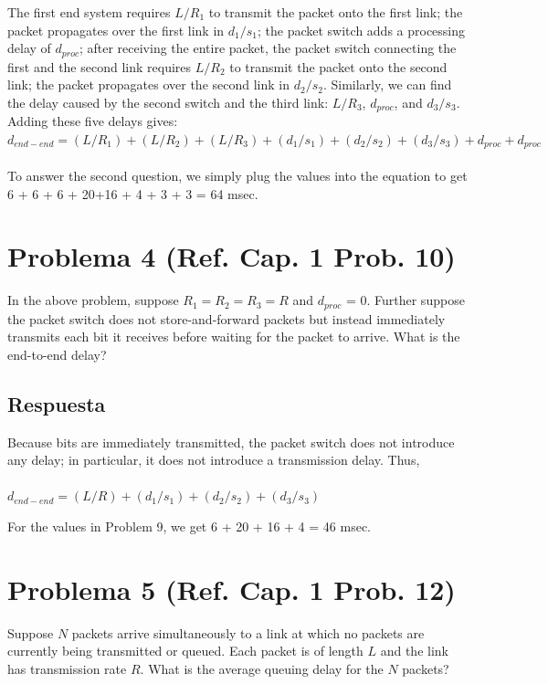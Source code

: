 \documentclass[10pt,spanish]{article}
\numberwithin{figure}{section} %
\begin{document}
The first end system requires $L/R_1$ to transmit the packet onto the first link; the packet propagates over the first link in $d_1 / s_1$; the packet switch adds a processing delay of $d_{proc}$; after receiving the entire packet, the packet switch connecting the first and the second link requires $L / R_2$ to transmit the packet onto the second link; the packet propagates over the second link in $d_2 / s_2$. Similarly, we can find the delay caused by the second switch and the third link: $L / R_3$, $d_{proc}$, and $d_3 / s_3$.\\
Adding these five delays gives: $d_{end-end} = (L / R_1) + (L / R_2) + (L / R_3) + (d_1 / s_1) + (d_2 / s_2) + (d_3 / s_3) + d_{proc} + d_{proc}$\\
 \\
To answer the second question, we simply plug the values into the equation to get 6 + 6 + 6 + 20+16 + 4 + 3 + 3 = 64 msec.

\section[Problema 4]{Problema 4 \textnormal{\Large{(Ref. Cap. 1 Prob. 10)}}}

In the above problem, suppose $R_1 = R_2 = R_3 = R$ and $d_{proc}$ = 0. Further suppose the packet switch does not store-and-forward packets but instead immediately transmits each bit it receives before waiting for the packet to arrive. What is the end-to-end delay?

\subsection*{Respuesta}

Because bits are immediately transmitted, the packet switch does not introduce any delay; in particular, it does not introduce a transmission delay. Thus,\\
 \\
$d_{end-end} = (L / R) + (d_1 / s_1) + (d_2 / s_2) + (d_3 / s_3)$
                    
For the values in Problem 9, we get 6 + 20 + 16 + 4 = 46 msec.


\section[Problema 5]{Problema 5 \textnormal{\Large{(Ref. Cap. 1 Prob. 12)}}}

Suppose $N$ packets arrive simultaneously to a link at which no packets are currently being transmitted or queued. Each packet is of length $L$ and the link has transmission rate $R$. What is the average queuing delay for the $N$ packets?
\end{document}
